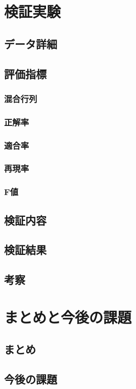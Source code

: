 \documentclass[platex]{suribt}
\begin{document}
\chapter{検証実験}
\section{データ詳細}
\section{評価指標}
\subsection{混合行列}
\subsection{正解率}
\subsection{適合率}
\subsection{再現率}
\subsection{F値}
\section{検証内容}
\section{検証結果}
\section{考察}

\chapter{まとめと今後の課題}
\section{まとめ}
\section{今後の課題}
\end{document}
